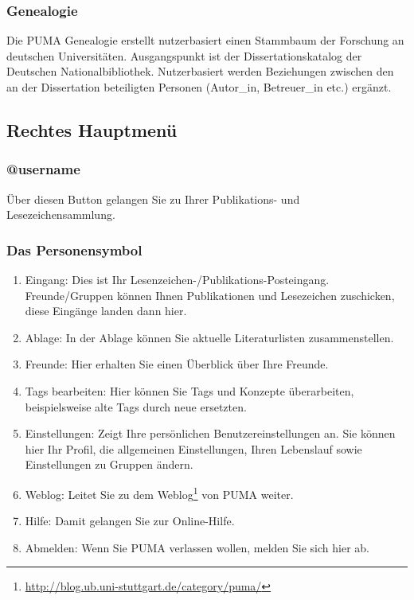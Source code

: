 \subsubsection{Genealogie}
Die PUMA Genealogie erstellt nutzerbasiert einen Stammbaum der Forschung an deutschen Universitäten. Ausgangspunkt ist der Dissertationskatalog der Deutschen Nationalbibliothek. Nutzerbasiert werden Beziehungen zwischen den an der Dissertation beteiligten Personen (Autor\_in, Betreuer\_in etc.) ergänzt.

\subsection{Rechtes Hauptmenü}
\subsubsection{@username}
Über diesen Button gelangen Sie zu Ihrer Publikations- und Lesezeichensammlung. 
\subsubsection{Das Personensymbol}
\begin{enumerate}
    \item Eingang: Dies ist Ihr Lesenzeichen-/Publikations-Posteingang. Freunde/Gruppen können Ihnen Publikationen und Lesezeichen zuschicken, diese Eingänge landen dann hier.
    \item Ablage: In der Ablage können Sie aktuelle Literaturlisten zusammenstellen. 
    \item Freunde: Hier erhalten Sie einen Überblick über Ihre Freunde. 
    \item Tags bearbeiten: Hier können Sie Tags und Konzepte überarbeiten, beispielsweise alte Tags durch neue ersetzten. 
    \item Einstellungen: Zeigt Ihre persönlichen Benutzereinstellungen an. Sie können hier Ihr Profil, die allgemeinen Einstellungen, Ihren Lebenslauf sowie Einstellungen zu Gruppen ändern.
    \item Weblog: Leitet Sie zu dem Weblog\footnote{\url{http://blog.ub.uni-stuttgart.de/category/puma/}} von PUMA weiter.
    \item Hilfe: Damit gelangen Sie zur Online-Hilfe.
    \item Abmelden: Wenn Sie PUMA verlassen wollen, melden Sie sich hier ab. 
\end{enumerate}

